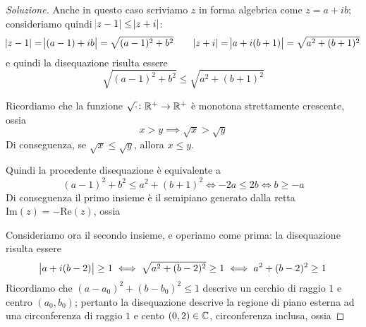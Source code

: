 \begin{proof}[Soluzione]
    Anche in questo caso scriviamo $z$ in forma algebrica come $z=a+ib$; consideriamo quindi $\abs{z-1}\le \abs{z+i}$:
    \[
    \abs{z-1} = \abs{(a-1)+ib} = \sqrt{(a-1)^2 + b^2} \qquad \abs{z+i} = \abs{a+i(b+1)} = \sqrt{a^2+(b+1)^2}
    \] 
    e quindi la disequazione risulta essere
    \[
    \sqrt{(a-1)^2+b^2}\le \sqrt{a^2+(b+1)^2}
    \]
    \begin{tcolorbox}
        Ricordiamo che la funzione $\sqrt{\cdot}\colon \amsbb{R}^+ \to \amsbb{R}^+$ è monotona strettamente crescente, ossia
        \[
        x > y \implies \sqrt{x}>\sqrt{y}
        \]
        Di conseguenza, se $\sqrt{x}\le \sqrt{y}$, allora $x\le y$.
    \end{tcolorbox}
    Quindi la procedente disequazione è equivalente a
    \[
    (a-1)^2+b^2\le a^2+(b+1)^2 \iff -2a \le 2b \iff b \ge -a
    \]
    Di conseguenza il primo insieme è il semipiano generato dalla retta $\mathrm{Im}(z) = -\mathrm{Re}(z)$, ossia
    \begin{center}
    \end{center}
    Consideriamo ora il secondo insieme, e operiamo come prima: la disequazione risulta essere
    \[
    \abs{a+i(b-2)}\ge 1 \iff \sqrt{a^2+(b-2)^2}\ge 1 \iff a^2 +(b-2)^2\ge 1
    \]
    Ricordiamo che $(a-a_0)^2+(b-b_0)^2 \le 1$ descrive un cerchio di raggio $1$ e centro $(a_0, b_0)$; pertanto la disequazione descrive la regione di piano esterna ad una circonferenza di raggio $1$ e cento $(0,2)\in\amsbb{C}$, circonferenza inclusa, ossia

\end{proof}
